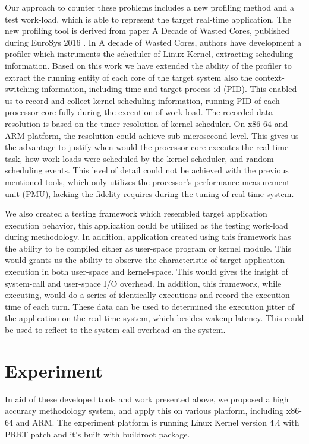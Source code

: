 \documentclass[conference]{IEEEtran}
\begin{document}
    Our approach to counter these problems includes a new profiling method and a test work-load, which is able to
    represent the target real-time application. The new profiling tool is derived from paper A Decade of Wasted Cores,
    published during EuroSys 2016 \cite{Lozi:2016:LSD:2901318.2901326}. In A decade of Wasted Cores, authors have
    development a profiler which instruments the scheduler of Linux Kernel, extracting scheduling information. Based on
    this work we have extended the ability of the profiler to extract the running entity of each core of the target
    system also the context-switching information, including time and target process id (PID). This enabled us to record
    and collect kernel scheduling information, running PID of each processor core fully during the execution of
    work-load. The recorded data resolution is based on the timer resolution of kernel scheduler. On x86-64 and ARM
    platform, the resolution could achieve sub-microsecond level. This gives us the advantage to justify when would the
    processor core executes the real-time task, how work-loads were scheduled by the kernel scheduler, and random
    scheduling events. This level of detail could not be achieved with the previous mentioned tools, which only utilizes
    the processor's performance measurement unit (PMU), lacking the fidelity requires during the tuning of real-time
    system.

    We also created a testing framework which resembled target application execution behavior, this application could be
    utilized as the testing work-load during methodology. In addition, application created using this framework has the
    ability to be compiled either as user-space program or kernel module. This would grants us the ability to observe
    the characteristic of target application execution in both user-space and kernel-space. This would gives the insight
    of system-call and user-space I/O overhead. In addition, this framework, while executing, would do a series of
    identically executions and record the execution time of each turn. These data can be used to determined the
    execution jitter of the application on the real-time system, which besides wakeup latency. This could be used to
    reflect to the system-call overhead on the system.

\section{Experiment}

    In aid of these developed tools and work presented above, we proposed a high accuracy methodology system, and apply
    this on various platform, including x86-64 and ARM. The experiment platform is running Linux Kernel version 4.4 with
    PR\textunderscore RT \cite{preemptrt} patch and it's built with buildroot \cite{buildroot} package.
    
\end{document}

